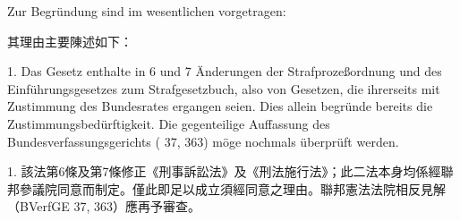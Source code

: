 \documentclass[12pt]{article}
\begin{document}
\syncleft
\begin{sourcepara}
Zur Begründung sind im wesentlichen vorgetragen:
\end{sourcepara}
\begin{transpara}
其理由主要陳述如下：
\end{transpara}

\syncleft
\begin{sourcepara}
1. Das Gesetz enthalte in \abbrArt{} 6 und 7 Änderungen der Strafprozeßordnung und des Einführungsgesetzes zum Strafgesetzbuch, also von Gesetzen, die ihrerseits mit Zustimmung des Bundesrates ergangen seien. Dies allein begründe bereits die Zustimmungsbedürftigkeit. Die gegenteilige Auffassung des Bundesverfassungsgerichts (\abbrBVerfGE{} 37, 363) möge nochmals überprüft werden.
\end{sourcepara}
\begin{transpara}
1. 該法第6條及第7條修正《刑事訴訟法》及《刑法施行法》；此二法本身均係經聯邦參議院同意而制定。僅此即足以成立須經同意之理由。聯邦憲法法院相反見解（BVerfGE 37, 363）應再予審查。
\end{transpara}
\end{document}
